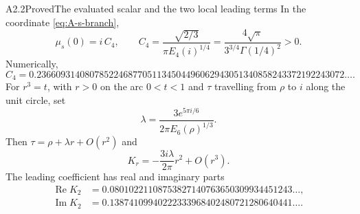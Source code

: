 \begin{claim}{A2.2}{Proved}{The evaluated scalar and the two local leading terms}
In the coordinate \eqref{eq:A-s-branch},
\begin{equation}\label{eq:A-mu-value}
\mu_s(0)=i\,C_4,
\qquad
C_4=\frac{\sqrt{2/3}}{\pi E_4(i)^{1/4}}
=\frac{4\sqrt\pi}{3^{3/4}\Gamma(1/4)^2}>0.
\end{equation}
Numerically,
\[
C_4=0.2366093140807852246877051134504496062943051340858243372192243072\ldots.
\]
For $r^3=t$, with $r>0$ on the arc $0<t<1$ and $\tau$ travelling
from $\rho$ to $i$ along the unit circle, set
\[
\lambda=\frac{3e^{5\pi i/6}}{2\pi E_6(\rho)^{1/3}}.
\]
Then $\tau=\rho+\lambda r+O(r^2)$ and
\[
K_r=-\frac{3i\lambda}{2\pi}r^2+O(r^3).
\]
The leading coefficient has real and imaginary parts
\[
\begin{aligned}
\operatorname{Re}K_2&=0.08010221108753827140763650309934451243\ldots,\\
\operatorname{Im}K_2&=0.13874109940222333968402480721280640441\ldots.
\end{aligned}
\]
\end{claim}
